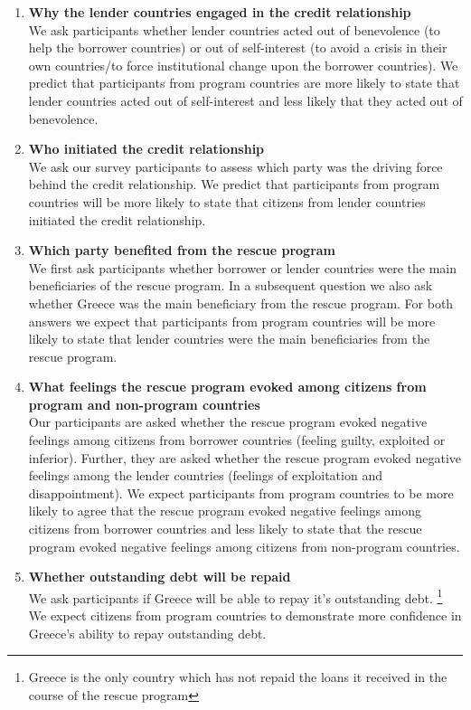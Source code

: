 \begin{enumerate} 
\item\textbf{Why the lender countries engaged in the credit relationship} \\
We ask participants whether lender countries acted out of benevolence (to help the borrower countries) or out of self-interest (to avoid a crisis in their own countries/to force institutional change upon the borrower countries). We predict that participants from program countries are more likely to state that lender countries acted out of self-interest and less likely that they acted out of benevolence. 

\item \textbf{Who initiated the credit relationship} \\
We ask our survey participants to assess which party was the driving force behind the credit relationship. We predict that participants from program countries will be more likely to state that citizens from lender countries initiated the credit relationship. 

\item \textbf{Which party benefited from the rescue program}\\ 
We first ask participants whether borrower or lender countries were the main beneficiaries of the rescue program. In a subsequent question we also ask whether Greece was the main beneficiary from the rescue program. For both answers we expect that participants from program countries will be more likely to state that lender countries were the main beneficiaries from the rescue program. 

\item \textbf{ What feelings the rescue program evoked among citizens from program and non-program countries}\\
Our participants are asked whether the rescue program evoked negative feelings among citizens from borrower countries (feeling guilty, exploited or inferior). Further, they are asked whether the rescue program evoked negative feelings among the lender countries (feelings of exploitation and disappointment).  
We expect participants from program countries to be more likely to agree that the rescue program evoked negative feelings among citizens from borrower countries and less likely to state that the rescue program evoked negative feelings among citizens from non-program countries. 
\item \textbf{Whether outstanding debt will be repaid} \\
We ask participants if Greece will be able to repay it's outstanding debt. \footnote{Greece is the only country which has not repaid the loans it received in the course of the rescue program} We expect citizens from program countries to demonstrate more confidence in Greece's ability to repay outstanding debt. 
\end{enumerate}
